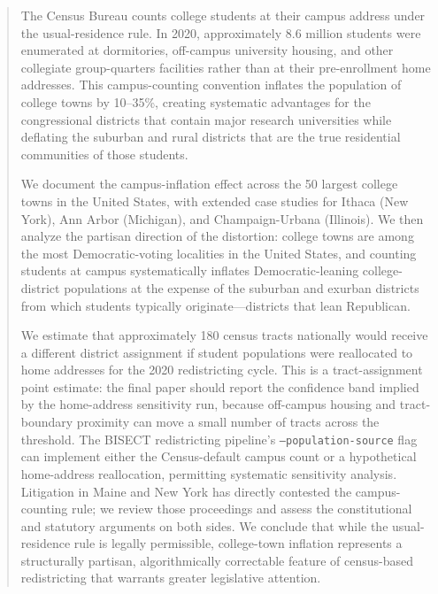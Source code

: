 \begin{abstract}
The Census Bureau counts college students at their campus address under the usual-residence rule. In 2020, approximately 8.6 million students were enumerated at dormitories, off-campus university housing, and other collegiate group-quarters facilities rather than at their pre-enrollment home addresses. This campus-counting convention inflates the population of college towns by 10--35\%, creating systematic advantages for the congressional districts that contain major research universities while deflating the suburban and rural districts that are the true residential communities of those students.

We document the campus-inflation effect across the 50 largest college towns in the United States, with extended case studies for Ithaca (New York), Ann Arbor (Michigan), and Champaign-Urbana (Illinois). We then analyze the partisan direction of the distortion: college towns are among the most Democratic-voting localities in the United States, and counting students at campus systematically inflates Democratic-leaning college-district populations at the expense of the suburban and exurban districts from which students typically originate---districts that lean Republican.

We estimate that approximately 180 census tracts nationally would receive a different district assignment if student populations were reallocated to home addresses for the 2020 redistricting cycle. This is a tract-assignment point estimate: the final paper should report the confidence band implied by the home-address sensitivity run, because off-campus housing and tract-boundary proximity can move a small number of tracts across the threshold. The BISECT redistricting pipeline's \texttt{--population-source} flag can implement either the Census-default campus count or a hypothetical home-address reallocation, permitting systematic sensitivity analysis. Litigation in Maine and New York has directly contested the campus-counting rule; we review those proceedings and assess the constitutional and statutory arguments on both sides. We conclude that while the usual-residence rule is legally permissible, college-town inflation represents a structurally partisan, algorithmically correctable feature of census-based redistricting that warrants greater legislative attention.
\end{abstract}
